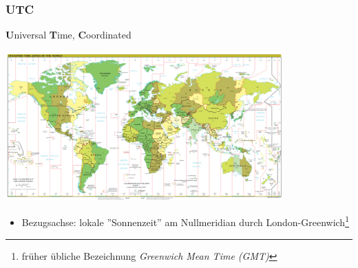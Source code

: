 \begin{frame}
    \frametitle{UTC}

    \textbf{U}niversal \textbf{T}ime, \textbf{C}oordinated

    \begin{center}
        \includegraphics[width=0.8\textwidth]{bv13/Standard_time_zones_of_the_world.png}
        \tiny \hyperlink{refs}{\cite{wc}}
    \end{center}

    \begin{itemize}
        \item Bezugsachse: lokale ''Sonnenzeit'' am Nullmeridian durch
              London-Greenwich\footnote{früher übliche Bezeichnung
              \emph{Greenwich Mean Time (GMT)}}
    \end{itemize}

\end{frame}

